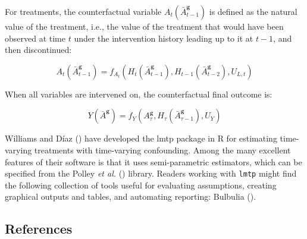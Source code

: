 \documentclass[
  single column]{article}
\begin{document}
For treatments, the counterfactual variable
\(A_t(\bar{A}^\mathbf{g}_{t-1})\) is defined as the natural value of the
treatment, i.e., the value of the treatment that would have been
observed at time \(t\) under the intervention history leading up to it
at \(t-1\), and then discontinued:

\[
A_t(\bar{A}^\mathbf{g}_{t-1}) = f_{A_t}(H_t(\bar{A}^\mathbf{g}_{t-1}), H_{t-1}(\bar{A}^\mathbf{g}_{t-2}), U_{L,t})
\]

When all variables are intervened on, the counterfactual final outcome
is:

\[
Y(\bar{A}^\mathbf{g}) = f_Y(A^\mathbf{g}_\tau, H_\tau(\bar{A}^\mathbf{g}_{\tau-1}), U_{Y})
\]

Williams and Díaz () have developed the
lmtp package in R for estimating time-varying treatments with
time-varying confounding. Among the many excellent features of their
software is that it uses semi-parametric estimators, which can be
specified from the Polley \emph{et al.}
() library. Readers working with
\texttt{lmtp} might find the following collection of tools useful for
evaluating assumptions, creating graphical outputs and tables, and
automating reporting: Bulbulia ().

\newpage{}

\subsection{References}\label{references}
\end{document}
